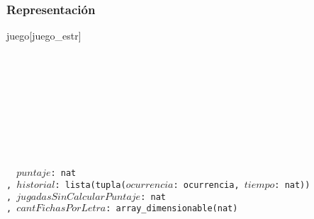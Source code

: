 \subsubsection*{Representación}
\begin{Estructura}{juego}[juego\_estr]
\begin{Tupla}
\begin{adjustwidth}{3em}{}\ \
  \\
  \\
  \\
  \\
\end{adjustwidth}\ \ \ \ \ \ \
\end{Tupla}
\begin{adjustwidth}{3em}{}\
\begin{Tupla}[jugador][y]
    \begin{adjustwidth}{2em}{}\
      \texttt{
        \textrm{$puntaje$:} nat\\
        \textrm{, $historial$:} lista(tupla(\textrm{$ocurrencia$:} ocurrencia\textrm{, $tiempo$:} nat))\\
        \textrm{, $jugadasSinCalcularPuntaje$:} nat\\
        \textrm{, $cantFichasPorLetra$:} array\_dimensionable(nat)
        }
      \end{adjustwidth}
\end{Tupla}
    \end{adjustwidth}
\end{Estructura}

